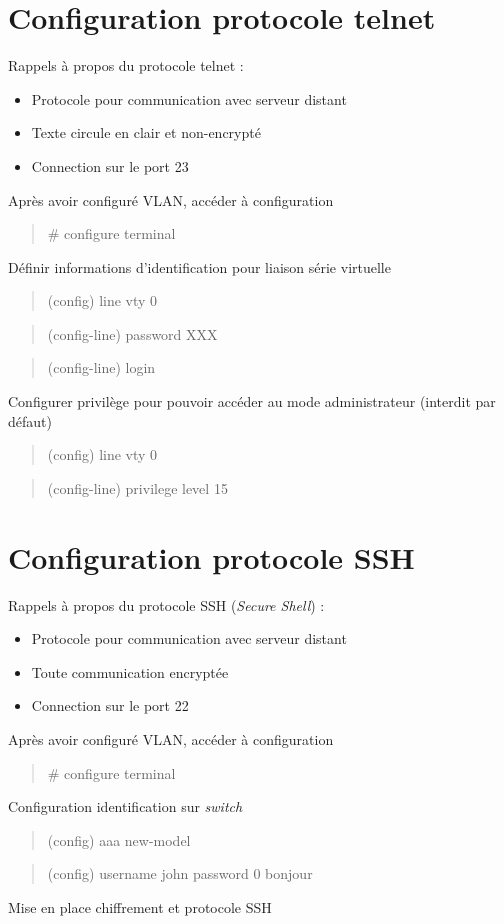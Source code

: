 \documentclass[a4paper, 11pt]{article}
\newcommand{\commande}[1] {
    \begin{quote}
    \tt\raggedright #1
    \end{quote}
}
\begin{document}
\section{Configuration protocole telnet}

Rappels à propos du protocole telnet : 

\begin{itemize}
\item Protocole pour communication avec serveur distant
\item Texte circule en clair et non-encrypté
\item Connection sur le port 23
\\
\end{itemize}

Après avoir configuré VLAN, accéder à configuration

\commande{\# configure terminal}

Définir informations d'identification pour liaison série virtuelle

\commande{(config) line vty 0}
\commande{(config-line) password XXX}
\commande{(config-line) login}

Configurer privilège pour pouvoir accéder au mode administrateur (interdit par défaut)

\commande{(config) line vty 0}
\commande{(config-line) privilege level 15}

\section{Configuration protocole SSH}

Rappels à propos du protocole SSH (\textit{Secure Shell}) : 

\begin{itemize}
\item Protocole pour communication avec serveur distant
\item Toute communication encryptée
\item Connection sur le port 22
\\
\end{itemize}

Après avoir configuré VLAN, accéder à configuration

\commande{\# configure terminal}

Configuration identification sur \textit{switch}

\commande{(config) aaa new-model}
\commande{(config) username john password 0 bonjour}

Mise en place chiffrement et protocole SSH
\end{document}
